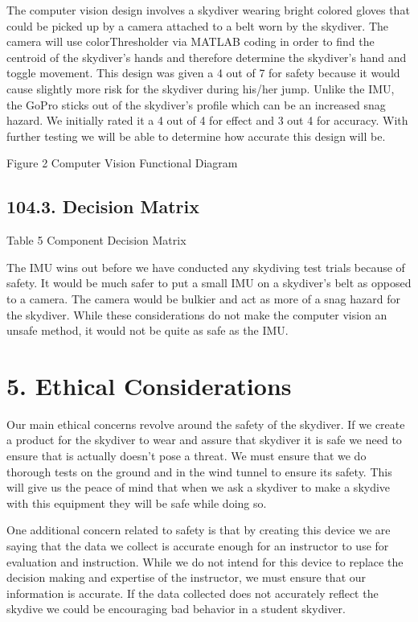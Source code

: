 \documentclass[10pt]{article}
\begin{document}
The computer vision design involves a skydiver wearing bright colored gloves that could be picked up by a camera attached to a belt worn by the skydiver. The camera will use colorThresholder via MATLAB coding in order to find the centroid of the skydiver’s hands and therefore determine the skydiver’s hand and toggle movement. This design was given a 4 out of 7 for safety because it would cause slightly more risk for the skydiver during his/her jump. Unlike the IMU, the GoPro sticks out of the skydiver’s profile which can be an increased snag hazard. We initially rated it a 4 out of 4 for effect and 3 out 4 for accuracy. With further testing we will be able to determine how accurate this design will be.

Figure 2 Computer Vision Functional Diagram



\subsection{104.3. Decision Matrix}

Table 5 Component Decision Matrix

The IMU wins out before we have conducted any skydiving test trials because of safety. It would be much safer to put a small IMU on a skydiver’s belt as opposed to a camera. The camera would be bulkier and act as more of a snag hazard for the skydiver. While these considerations do not make the computer vision an unsafe method, it would not be quite as safe as the IMU.











\section{5. Ethical Considerations}

Our main ethical concerns revolve around the safety of the skydiver. If we create a product for the skydiver to wear and assure that skydiver it is safe we need to ensure that is actually doesn’t pose a threat. We must ensure that we do thorough tests on the ground and in the wind tunnel to ensure its safety. This will give us the peace of mind that when we ask a skydiver to make a skydive with this equipment they will be safe while doing so.



One additional concern related to safety is that by creating this device we are saying that the data we collect is accurate enough for an instructor to use for evaluation and instruction. While we do not intend for this device to replace the decision making and expertise of the instructor, we must ensure that our information is accurate. If the data collected does not accurately reflect the skydive we could be encouraging bad behavior in a student skydiver.
\end{document}
